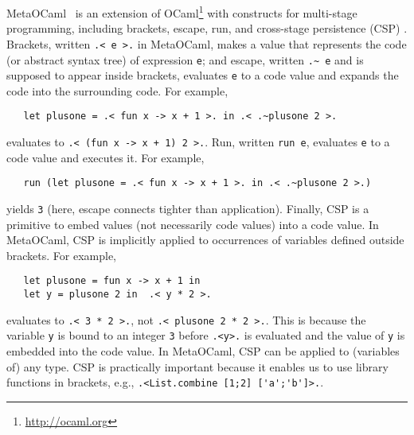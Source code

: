 MetaOCaml~\cite{calcagno2003implementing,oleg2014} is an extension of
OCaml\footnote{\url{http://ocaml.org}} with constructs for multi-stage
programming, including brackets, escape, run, and cross-stage
persistence (CSP) .  Brackets, written \verb|.< e >.| in MetaOCaml,
makes a value that represents the code (or abstract syntax tree) of
expression \verb|e|; and escape, written \verb|.~ e| and is supposed
to appear inside brackets, evaluates \verb|e| to a code value and
expands the code into the surrounding code.
For example,
\begin{verbatim}
   let plusone = .< fun x -> x + 1 >. in .< .~plusone 2 >.
\end{verbatim}
evaluates to \verb|.< (fun x -> x + 1) 2 >.|.  
Run, written \verb|run e|, evaluates \verb|e| to a code value
and executes it.  For example,
\begin{verbatim}
   run (let plusone = .< fun x -> x + 1 >. in .< .~plusone 2 >.)
\end{verbatim}
yields \verb|3| (here, escape connects tighter than application).
Finally, CSP is a primitive to embed values (not necessarily code
values) into a code value.  In MetaOCaml, CSP is implicitly applied to
occurrences of variables defined outside brackets.  For example,
\begin{verbatim}
   let plusone = fun x -> x + 1 in
   let y = plusone 2 in  .< y * 2 >.
\end{verbatim}
evaluates to \verb|.< 3 * 2 >.|, not \verb|.< plusone 2 * 2 >.|.
This is because the variable \verb|y| is bound to an integer \verb|3|
before \verb|.<y>.| is evaluated and the value of \verb|y| is embedded
into the code value.  In MetaOCaml, CSP can be applied to (variables of) any type.  CSP is practically important because it enables us to use library functions in brackets, e.g., \verb|.<List.combine [1;2] ['a';'b']>.|.



